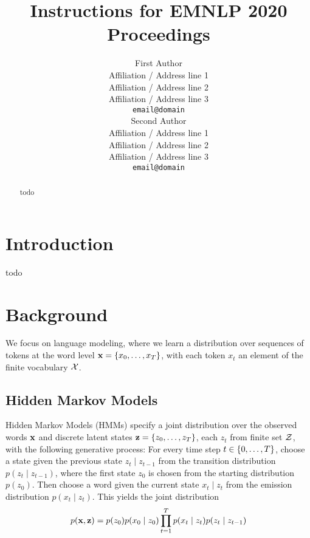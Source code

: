 \documentclass[11pt,a4paper]{article}
\title{Instructions for EMNLP 2020 Proceedings}
\author{First Author \\
  Affiliation / Address line 1 \\
  Affiliation / Address line 2 \\
  Affiliation / Address line 3 \\
  \texttt{email@domain} \\\And
  Second Author \\
  Affiliation / Address line 1 \\
  Affiliation / Address line 2 \\
  Affiliation / Address line 3 \\
  \texttt{email@domain} \\}
\date{}
\begin{document}
\maketitle
\begin{abstract}
todo
\end{abstract}

\section{Introduction}

todo


\section{Background}
We focus on language modeling,
where we learn a distribution over sequences of tokens
at the word level $\mathbf{x} = \left\{x_0, \ldots, x_T\right\}$, with each token $x_t$
an element of the finite vocabulary $\mathcal{X}$.

\subsection{Hidden Markov Models}
Hidden Markov Models (HMMs) specify a joint distribution over 
the observed words $\mathbf{x}$ and discrete latent states $\mathbf{z} = \left\{z_0, \ldots, z_T\right\}$,
each $z_t$ from finite set $\mathcal{Z}$,
with the following generative process:
For every time step $t \in \left\{0,\ldots,T\right\}$, choose a state given the previous state
$z_t \mid z_{t-1}$ from the transition distribution $p(z_t \mid z_{t-1})$,
where the first state $z_0$ is chosen from the starting distribution $p(z_0)$.
Then choose a word given the current state $x_t \mid z_t$ from the emission distribution $p(x_t \mid z_t)$.
This yields the joint distribution
\begin{equation}
p(\mathbf{x}, \mathbf{z})
= p(z_0)p(x_0 \mid z_0)\prod_{t=1}^T p(x_t\mid z_t)p(z_t \mid z_{t-1})
\end{equation}


\end{document}
